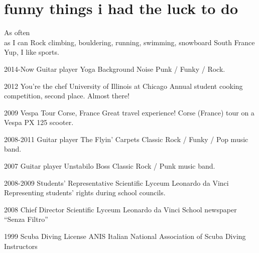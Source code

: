 \documentclass[]{friggeri-cv} %
\begin{document}
\section{funny things i had the luck to do}
\begin{entrylist}
\entry
{As often\\as I can}
{Rock climbing, bouldering, running, swimming, snowboard}
{South France}
{Yup, I like sports.}

\entry
{2014-Now}
{Guitar player}
{Yoga Background Noise}
{Punk / Funky / Rock.}

\entry
{2012}
{You're the chef}
{University of Illinois at Chicago}
{Annual student cooking competition, second place. Almost there!}

\entry
{2009}
{Vespa Tour}
{Corse, France}
{Great travel experience! Corse (France) tour on a Vespa PX 125 scooter.}

\entry
{2008-2011}
{Guitar player}
{The Flyin' Carpets}
{Classic Rock / Funky / Pop music band.}

\entry
{2007}
{Guitar player}
{Unstabilo Boss}
{Classic Rock / Punk music band.}

\entry
{2008-2009}
{Students' Representative}
{Scientific Lyceum Leonardo da Vinci}
{Representing students' rights during school councils.}

\entry
{2008}
{Chief Director}
{Scientific Lyceum Leonardo da Vinci}
{School newspaper ``Senza Filtro''}

\entry
{1999}
{Scuba Diving License}
{ANIS}
{Italian National Association of Scuba Diving Instructors}
\end{entrylist}
\end{document}
